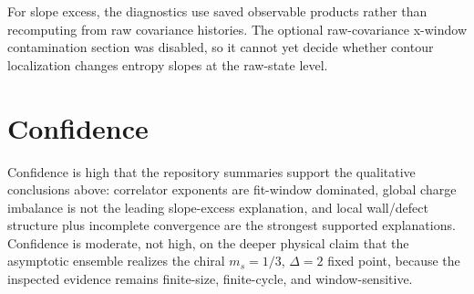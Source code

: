 \documentclass[aps,prb,onecolumn,nofootinbib,superscriptaddress]{revtex4-2}
\begin{document}
For slope excess, the diagnostics use saved observable products rather than recomputing from raw covariance histories. The optional raw-covariance x-window contamination section was disabled, so it cannot yet decide whether contour localization changes entropy slopes at the raw-state level.

\section{Confidence}

Confidence is high that the repository summaries support the qualitative conclusions above: correlator exponents are fit-window dominated, global charge imbalance is not the leading slope-excess explanation, and local wall/defect structure plus incomplete convergence are the strongest supported explanations. Confidence is moderate, not high, on the deeper physical claim that the asymptotic ensemble realizes the chiral \(m_s=1/3\), \(\Delta=2\) fixed point, because the inspected evidence remains finite-size, finite-cycle, and window-sensitive.
\end{document}
